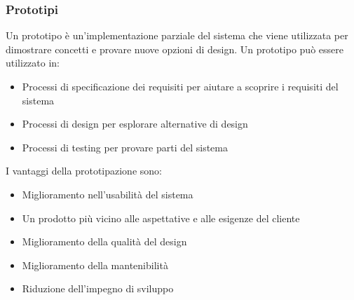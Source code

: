 \documentclass[a4paper]{article}
\begin{document}
\subsubsection{Prototipi}
Un prototipo è un'implementazione parziale del sistema che viene utilizzata per dimostrare
concetti e provare nuove opzioni di design. Un prototipo può essere utilizzato in:
\begin{itemize}
  \item Processi di specificazione dei requisiti per aiutare a scoprire i requisiti
    del sistema

  \item Processi di design per esplorare alternative di design

  \item Processi di testing per provare parti del sistema
\end{itemize}
I vantaggi della prototipazione sono:
\begin{itemize}
  \item Miglioramento nell'usabilità del sistema
  \item Un prodotto più vicino alle aspettative e alle esigenze del cliente
  \item Miglioramento della qualità del design
  \item Miglioramento della mantenibilità
  \item Riduzione dell'impegno di sviluppo
\end{itemize}
\end{document}
